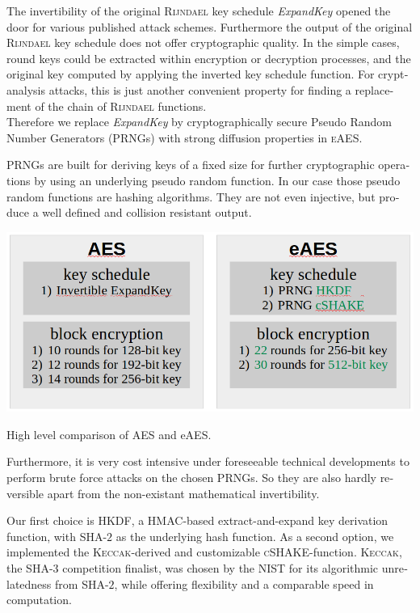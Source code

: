 \documentclass[a4paper,11pt]{article}
\begin{document}
\begin{otherlanguage}{english}
\begin{multicols}{2}
\noindent
The invertibility of the original \textsc{Rijndael} key schedule \textit{ExpandKey} opened the door for various published attack schemes. Furthermore the output of the original \textsc{Rijndael} key schedule does not offer cryptographic quality. In the simple cases, round keys could be extracted within encryption or decryption processes, and the original key computed by applying the inverted key schedule function. For cryptanalysis attacks, this is just another convenient property for finding a replacement of the chain of \textsc{Rijndael} functions. \\
Therefore we replace \textit{ExpandKey} by cryptographically secure Pseudo Random Number Generators (PRNGs) with strong diffusion properties in \textsc{eAES}. 

\noindent
PRNGs are built for deriving keys of a fixed size for further cryptographic operations by using an underlying pseudo random function. In our case those pseudo random functions are hashing algorithms. They are not even injective, but produce a well defined and collision resistant output. 

\begin{figurehere}
  \centering
  \includegraphics[width=\columnwidth]{comparison.png}
  \caption{High level comparison of AES and eAES.\label{abb_2}}
\end{figurehere}
\vspace{1cm}

\noindent
Furthermore, it is very cost intensive under foreseeable technical developments to perform brute force attacks on the chosen PRNGs. So they are also hardly reversible apart from the non-existant mathematical invertibility.


\noindent
Our first choice is \textsc{HKDF}, a HMAC-based extract-and-expand key derivation function, with \textsc{SHA}-$2$ as the underlying hash function. As a second option, we implemented the \textsc{Keccak}-derived and customizable \textsc{cSHAKE}-function. \textsc{Keccak}, the \textsc{SHA}-$3$ competition finalist, was chosen by the NIST for its algorithmic unrelatedness from \textsc{SHA}-$2$, while offering flexibility and a comparable speed in computation. 
\vspace{0.01cm}


\end{multicols}
\end{otherlanguage}
\end{document}
